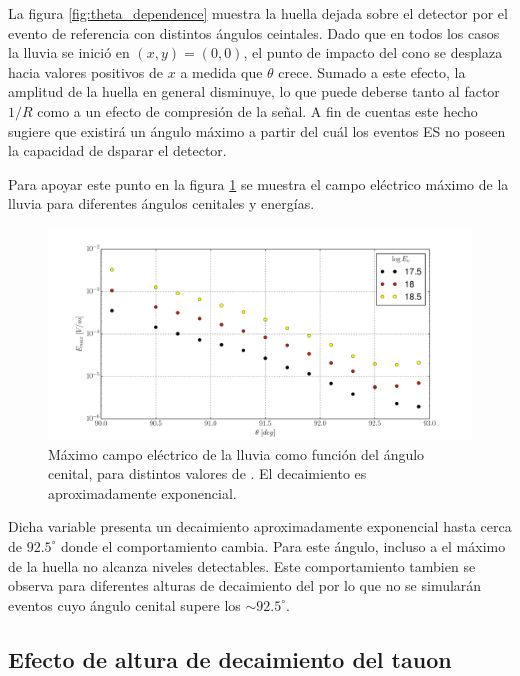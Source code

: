 	La figura \ref{fig:theta_dependence} muestra la huella dejada sobre el detector por el evento de referencia con distintos \'angulos ceintales.
	Dado que en todos los casos la lluvia se inici\'o en $(x,y)=(0,0)$, el punto de impacto del cono \cher{} se desplaza hacia valores positivos de $x$ a medida que $\theta$ crece.
	Sumado a este efecto, la amplitud de la huella en general disminuye, lo que puede deberse tanto al factor $1/R$ como a un efecto de compresi\'on de la se\~nal.
	A fin de cuentas este hecho sugiere que existir\'a un \'angulo m\'aximo a partir del cu\'al los eventos ES no poseen la capacidad de dsparar el detector.
	
	Para apoyar este punto en la figura \ref{fig:theta_dependence2} se muestra el campo el\'ectrico m\'aximo de la lluvia para diferentes \'angulos cenitales y energ\'ias.
	\begin{figure}[ht!]
		\centering
		\includegraphics[width=\textwidth]{./fig/simulacionRadio/maxDep/eMaxTh}
		\caption{\label{fig:theta_dependence2}
		M\'aximo campo el\'ectrico de la lluvia como funci\'on del \'angulo cenital, para distintos valores de \ev{}. El decaimiento es aproximadamente exponencial.
		}
	\end{figure}
	Dicha variable presenta un decaimiento aproximadamente exponencial hasta cerca de $92.5^\circ$ donde el comportamiento cambia.
	Para este \'angulo, incluso a  el m\'aximo de la huella no alcanza niveles detectables.
	Este comportamiento tambien se observa para diferentes alturas de decaimiento del \tauon{} por lo que no se simular\'an eventos cuyo \'angulo cenital supere los $\sim92.5^\circ$.
	
	\subsection{Efecto de altura de decaimiento del tauon \xd{}}
	
